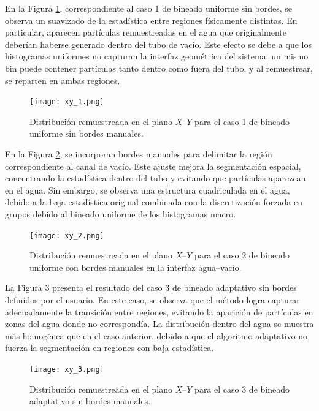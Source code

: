 En la Figura \ref{fig:xy_1}, correspondiente al caso 1 de bineado uniforme sin bordes, se observa un suavizado de la estadística entre regiones físicamente distintas. En particular, aparecen partículas remuestreadas en el agua que originalmente deberían haberse generado dentro del tubo de vacío. Este efecto se debe a que los histogramas uniformes no capturan la interfaz geométrica del sistema: un mismo bin puede contener partículas tanto dentro como fuera del tubo, y al remuestrear, se reparten en ambas regiones.

\begin{figure}[H]
    \centering
    \texttt{[image: xy\_1.png]}
    \caption{Distribución remuestreada en el plano $X$–$Y$ para el caso 1 de bineado uniforme sin bordes manuales.}
    \label{fig:xy_1}
\end{figure}

En la Figura \ref{fig:xy_2}, se incorporan bordes manuales para delimitar la región correspondiente al canal de vacío. Este ajuste mejora la segmentación espacial, concentrando la estadística dentro del tubo y evitando que partículas aparezcan en el agua. Sin embargo, se observa una estructura cuadriculada en el agua, debido a la baja estadística original combinada con la discretización forzada en grupos debido al bineado uniforme de los histogramas macro.

\begin{figure}[H]
    \centering
    \texttt{[image: xy\_2.png]}
    \caption{Distribución remuestreada en el plano $X$–$Y$ para el caso 2 de bineado uniforme con bordes manuales en la interfaz agua–vacío.}
    \label{fig:xy_2}
\end{figure}

La Figura \ref{fig:xy_3} presenta el resultado del caso 3 de bineado adaptativo sin bordes definidos por el usuario. En este caso, se observa que el método logra capturar adecuadamente la transición entre regiones, evitando la aparición de partículas en zonas del agua donde no correspondía. La distribución dentro del agua se muestra más homogénea que en el caso anterior, debido a que el algoritmo adaptativo no fuerza la segmentación en regiones con baja estadística.

\begin{figure}[H]
    \centering
    \texttt{[image: xy\_3.png]}
    \caption{Distribución remuestreada en el plano $X$–$Y$ para el caso 3 de bineado adaptativo sin bordes manuales.}
    \label{fig:xy_3}
\end{figure}

